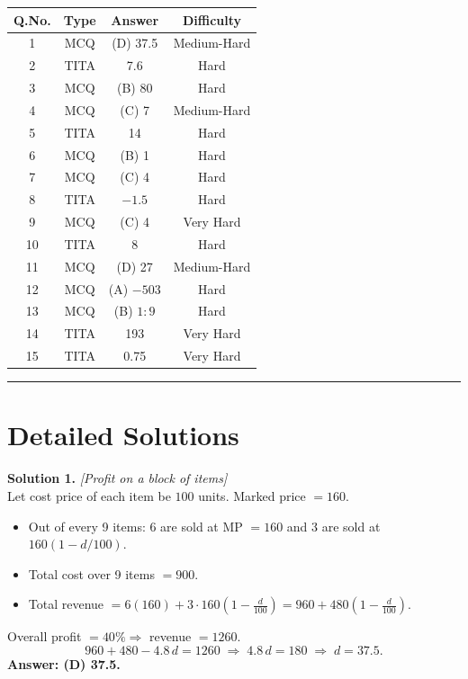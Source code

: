 \documentclass[11pt,a4paper]{article}
\begin{document}
\begin{center}
\begin{tabular}{|c|c|c|c|}
\hline
\textbf{Q.No.} & \textbf{Type} & \textbf{Answer} & \textbf{Difficulty} \\
\hline
1  & MCQ  & (D) 37.5       & Medium-Hard \\
2  & TITA & 7.6            & Hard \\
3  & MCQ  & (B) 80         & Hard \\
4  & MCQ  & (C) 7          & Medium-Hard \\
5  & TITA & 14             & Hard \\
6  & MCQ  & (B) 1          & Hard \\
7  & MCQ  & (C) 4          & Hard \\
8  & TITA & $-1.5$         & Hard \\
9  & MCQ  & (C) 4          & Very Hard \\
10 & TITA & 8              & Hard \\
11 & MCQ  & (D) 27         & Medium-Hard \\
12 & MCQ  & (A) $-503$     & Hard \\
13 & MCQ  & (B) $1:9$      & Hard \\
14 & TITA & 193            & Very Hard \\
15 & TITA & 0.75           & Very Hard \\
\hline
\end{tabular}
\end{center}

\hrule
\section*{Detailed Solutions}

\textbf{Solution 1.} \textit{[Profit on a block of items]}\\
Let cost price of each item be $100$ units. Marked price $= 160$.
\begin{itemize}[leftmargin=*]
  \item Out of every 9 items: 6 are sold at MP $= 160$ and 3 are sold at $160(1 - d/100)$.
  \item Total cost over 9 items $= 900$.
  \item Total revenue $= 6(160) + 3 \cdot 160\!\left(1 - \tfrac{d}{100}\right) = 960 + 480\!\left(1 - \tfrac{d}{100}\right)$.
\end{itemize}
Overall profit $= 40\% \Rightarrow$ revenue $= 1260$.
\[
960 + 480 - 4.8\,d = 1260 \;\Longrightarrow\; 4.8\,d = 180 \;\Longrightarrow\; d = 37.5.
\]
\textbf{Answer: (D) 37.5.}
\end{document}
